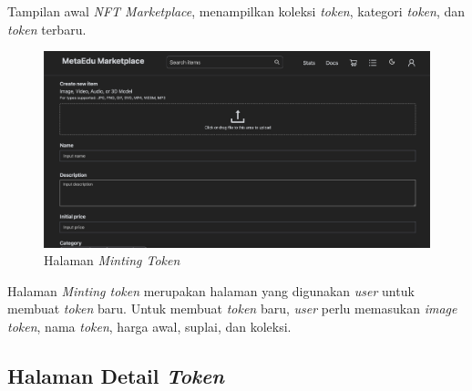 Tampilan awal \emph{NFT Marketplace}, menampilkan koleksi \emph{token}, kategori \emph{token}, dan \emph{token} terbaru.

\begin{figure} [H] \centering
  \includegraphics[scale=0.3]{gambar/img-frontend-add-token.png}
  \caption{Halaman \emph{Minting Token}}
  \label{fig:TokenMinting}
\end{figure}

Halaman \emph{Minting token} merupakan halaman yang digunakan \emph{user} untuk membuat \emph{token} baru. Untuk membuat \emph{token} baru, \emph{user} perlu memasukan \emph{image} \emph{token}, nama \emph{token}, harga awal, suplai, dan koleksi. 

\subsection{Halaman Detail \emph{Token}}

